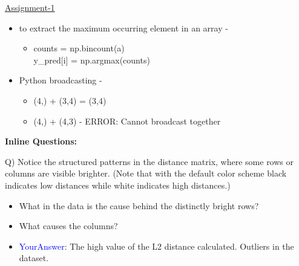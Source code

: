 \documentclass[twoside]{article}
\begin{document}
\underline{Assignment-1}\\
\begin{itemize}
\item to extract the maximum occurring element in an array - 
\begin{itemize}
\item counts =  np.bincount(a) \\
y\_pred[i] = np.argmax(counts)


\end{itemize}
\item Python broadcasting - 
\begin{itemize}
    \item (4,) + (3,4) = (3,4)
    \item (4,) + (4,3) - ERROR: Cannot broadcast together
\end{itemize}

\end{itemize}

\textbf{Inline Questions:}

Q) Notice the structured patterns in the distance matrix, where some rows or columns are visible brighter. (Note that with the default color scheme black indicates low distances while white indicates high distances.)

\begin{itemize}
    \item What in the data is the cause behind the distinctly bright rows?
    \item What causes the columns?
    \item \textcolor{blue}{YourAnswer}:  The high value of the L2 distance calculated. Outliers in the dataset.
\end{itemize}
\end{document}
